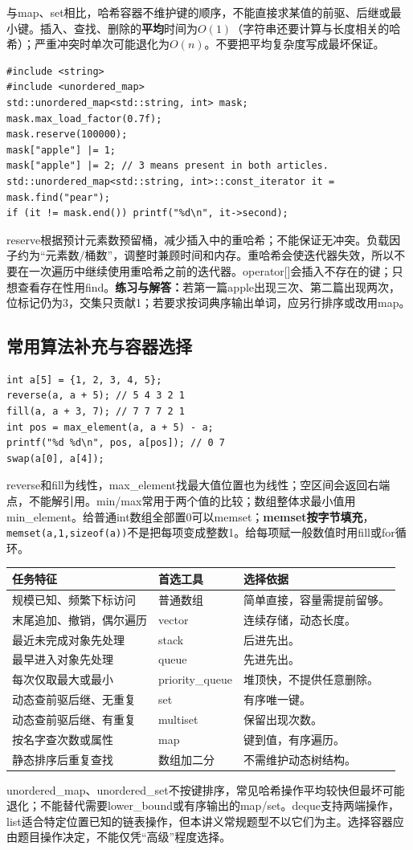 与map、set相比，哈希容器不维护键的顺序，不能直接求某值的前驱、后继或最小键。插入、查找、删除的\textbf{平均}时间为$O(1)$（字符串还要计算与长度相关的哈希）；严重冲突时单次可能退化为$O(n)$。不要把平均复杂度写成最坏保证。
\begin{lstlisting}
#include <string>
#include <unordered_map>
std::unordered_map<std::string, int> mask;
mask.max_load_factor(0.7f);
mask.reserve(100000);
mask["apple"] |= 1;
mask["apple"] |= 2; // 3 means present in both articles.
std::unordered_map<std::string, int>::const_iterator it = mask.find("pear");
if (it != mask.end()) printf("%d\n", it->second);
\end{lstlisting}
reserve根据预计元素数预留桶，减少插入中的重哈希；不能保证无冲突。负载因子约为“元素数/桶数”，调整时兼顾时间和内存。重哈希会使迭代器失效，所以不要在一次遍历中继续使用重哈希之前的迭代器。operator[]会插入不存在的键；只想查看存在性用find。\textbf{练习与解答：}若第一篇apple出现三次、第二篇出现两次，位标记仍为3，交集只贡献1；若要求按词典序输出单词，应另行排序或改用map。

\subsection{常用算法补充与容器选择}
\begin{lstlisting}
int a[5] = {1, 2, 3, 4, 5};
reverse(a, a + 5); // 5 4 3 2 1
fill(a, a + 3, 7); // 7 7 7 2 1
int pos = max_element(a, a + 5) - a;
printf("%d %d\n", pos, a[pos]); // 0 7
swap(a[0], a[4]);
\end{lstlisting}
reverse和fill为线性，max\_element找最大值位置也为线性；空区间会返回右端点，不能解引用。min/max常用于两个值的比较；数组整体求最小值用min\_element。给普通int数组全部置0可以memset；\textbf{memset按字节填充}，\texttt{memset(a,1,sizeof(a))}不是把每项变成整数1。给每项赋一般数值时用fill或for循环。

\begin{longtable}{P{5.4cm}P{3.2cm}P{5.6cm}}
\toprule 任务特征 & 首选工具 & 选择依据\\\midrule\endhead
规模已知、频繁下标访问 & 普通数组 & 简单直接，容量需提前留够。\\
末尾追加、撤销，偶尔遍历 & vector & 连续存储，动态长度。\\
最近未完成对象先处理 & stack & 后进先出。\\
最早进入对象先处理 & queue & 先进先出。\\
每次仅取最大或最小 & priority\_queue & 堆顶快，不提供任意删除。\\
动态查前驱后继、无重复 & set & 有序唯一键。\\
动态查前驱后继、有重复 & multiset & 保留出现次数。\\
按名字查次数或属性 & map & 键到值，有序遍历。\\
静态排序后重复查找 & 数组加二分 & 不需维护动态树结构。\\
\bottomrule
\end{longtable}
unordered\_map、unordered\_set不按键排序，常见哈希操作平均较快但最坏可能退化；不能替代需要lower\_bound或有序输出的map/set。deque支持两端操作，list适合特定位置已知的链表操作，但本讲义常规题型不以它们为主。选择容器应由题目操作决定，不能仅凭“高级”程度选择。

